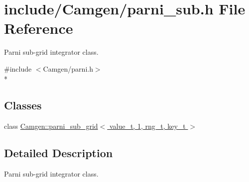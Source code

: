 \hypertarget{a00685}{\section{include/\-Camgen/parni\-\_\-sub.h File Reference}
\label{a00685}
}


Parni sub-\/grid integrator class.  


{\ttfamily \#include $<$Camgen/parni.\-h$>$}\\*
\subsection*{Classes}
\begin{DoxyCompactItemize}
\item 
class \hyperlink{a00391}{Camgen\-::parni\-\_\-sub\-\_\-grid$<$ value\-\_\-t, 1, rng\-\_\-t, key\-\_\-t $>$}
\end{DoxyCompactItemize}


\subsection{Detailed Description}
Parni sub-\/grid integrator class. 